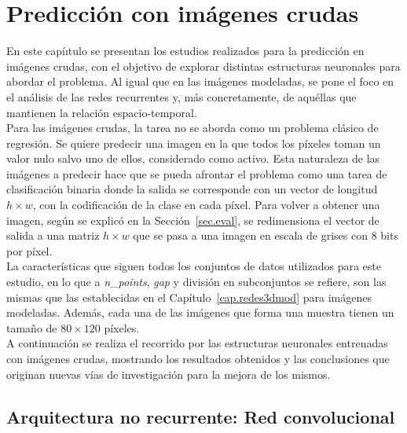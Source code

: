 \chapter{Predicción con imágenes crudas}\label{cap.redes3dcrud}

En este capíıtulo se presentan los estudios realizados para la predicción en imágenes crudas, con el objetivo de explorar distintas estructuras neuronales para abordar el problema. Al igual que en las imágenes modeladas, se pone el foco en el análisis de las redes recurrentes y, más concretamente, de aquéllas que mantienen la relación espacio-temporal.\\

Para las imágenes crudas, la tarea no se aborda como un problema clásico de regresión. Se quiere predecir una imagen en la que todos los píxeles toman un valor nulo salvo uno de ellos, considerado como activo. Esta naturaleza de las imágenes a predecir hace que se pueda afrontar el problema como una tarea de clasificación binaria donde la salida se corresponde con un vector de longitud $h \times w$, con la codificación de la clase en cada píxel. Para volver a obtener una imagen, según se explicó en la Sección~\ref{sec.eval}, se redimensiona el vector de salida a una matriz $h \times w$ que se pasa a una imagen en escala de grises con 8 bits por píxel.\\

La características que siguen todos los conjuntos de datos utilizados para este estudio, en lo que a \textit{n}\_\textit{points}, \textit{gap} y división en subconjuntos se refiere, son las mismas que las establecidas en el Capítulo~\ref{cap.redes3dmod} para imágenes modeladas. Además, cada una de las imágenes que forma una muestra tienen un tamaño de $80 \times 120$ píxeles.\\

A continuación se realiza el recorrido por las  estructuras neuronales entrenadas con imágenes crudas, mostrando los resultados obtenidos y las conclusiones que originan nuevas vías de investigación para la mejora de los mismos.


\section{Arquitectura no recurrente: Red convolucional} \label{sec.raw_norec_cnn}

